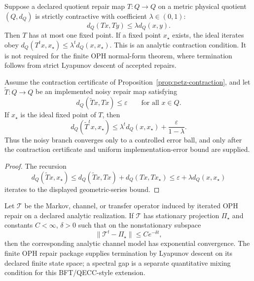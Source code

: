 \begin{proposition}
\label{prop:petz-contraction}
Suppose a declared quotient repair map \(T:Q\to Q\) on a metric physical quotient
\((Q,d_Q)\) is strictly contractive with coefficient \(\lambda\in(0,1)\):
\[
  d_Q(Tx,Ty)\le \lambda d_Q(x,y).
\]
Then \(T\) has at most one fixed point. If a fixed point \(x_\star\) exists, the ideal iterates
obey \(d_Q(T^t x,x_\star)\le \lambda^t d_Q(x,x_\star)\).
This is an analytic contraction condition. It is not required for the finite OPH normal-form
theorem, where termination follows from strict Lyapunov descent of accepted repairs.
\end{proposition}

\begin{theorem}
\label{thm:noisy-contraction}
Assume the contraction certificate of Proposition~\ref{prop:petz-contraction}, and let
\(\widetilde T:Q\to Q\) be an implemented noisy repair map satisfying
\[
d_Q(\widetilde T x,Tx)\le \varepsilon
\qquad\text{for all }x\in Q.
\]
If \(x_\star\) is the ideal fixed point of \(T\), then
\[
d_Q(\widetilde T^t x,x_\star)
\le
\lambda^t d_Q(x,x_\star)+\frac{\varepsilon}{1-\lambda}.
\]
Thus the noisy branch converges only to a controlled error ball, and only after the contraction
certificate and uniform implementation-error bound are supplied.
\end{theorem}

\begin{proof}
The recursion
\[
d_Q(\widetilde T x,x_\star)
\le d_Q(\widetilde T x,Tx)+d_Q(Tx,Tx_\star)
\le \varepsilon+\lambda d_Q(x,x_\star)
\]
iterates to the displayed geometric-series bound.
\end{proof}

\begin{proposition}
\label{conj:spectral-gap}
Let \(\mathcal T\) be the Markov, channel, or transfer operator induced by iterated OPH repair on
a declared analytic realization. If \(\mathcal T\) has stationary projection \(\Pi_\star\) and
constants \(C<\infty\), \(\delta>0\) such that on the nonstationary subspace
\[
\|\mathcal T^t-\Pi_\star\|\le C e^{-\delta t},
\]
then the corresponding analytic channel model has exponential convergence. The finite OPH repair
package supplies termination by Lyapunov descent on its declared finite state space; a spectral
gap is a separate quantitative mixing condition for this BFT/QECC-style extension.
\end{proposition}

